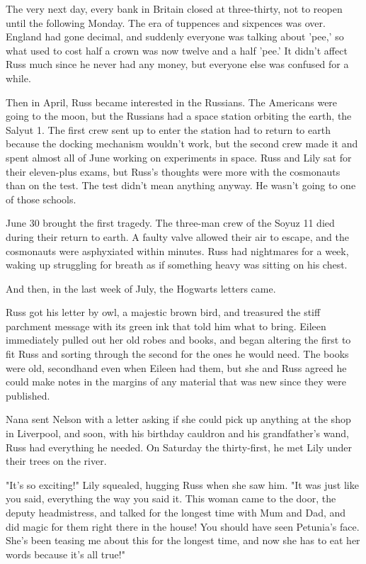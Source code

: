 \documentclass[a4paper,11pt]{article}
\begin{document}
The very next day, every bank in Britain closed at three-thirty, not to reopen until the following Monday. The era of tuppences and sixpences was over. England had gone decimal, and suddenly everyone was talking about 'pee,' so what used to cost half a crown was now twelve and a half 'pee.' It didn't affect Russ much since he never had any money, but everyone else was confused for a while.

Then in April, Russ became interested in the Russians. The Americans were going to the moon, but the Russians had a space station orbiting the earth, the Salyut 1. The first crew sent up to enter the station had to return to earth because the docking mechanism wouldn't work, but the second crew made it and spent almost all of June working on experiments in space. Russ and Lily sat for their eleven-plus exams, but Russ's thoughts were more with the cosmonauts than on the test. The test didn't mean anything anyway. He wasn't going to one of those schools.

June 30 brought the first tragedy. The three-man crew of the Soyuz 11 died during their return to earth. A faulty valve allowed their air to escape, and the cosmonauts were asphyxiated within minutes. Russ had nightmares for a week, waking up struggling for breath as if something heavy was sitting on his chest.

And then, in the last week of July, the Hogwarts letters came.

Russ got his letter by owl, a majestic brown bird, and treasured the stiff parchment message with its green ink that told him what to bring. Eileen immediately pulled out her old robes and books, and began altering the first to fit Russ and sorting through the second for the ones he would need. The books were old, secondhand even when Eileen had them, but she and Russ agreed he could make notes in the margins of any material that was new since they were published.

Nana sent Nelson with a letter asking if she could pick up anything at the shop in Liverpool, and soon, with his birthday cauldron and his grandfather's wand, Russ had everything he needed. On Saturday the thirty-first, he met Lily under their trees on the river.

"It's so exciting!" Lily squealed, hugging Russ when she saw him. "It was just like you said, everything the way you said it. This woman came to the door, the deputy headmistress, and talked for the longest time with Mum and Dad, and did magic for them right there in the house! You should have seen Petunia's face. She's been teasing me about this for the longest time, and now she has to eat her words because it's all true!"
\end{document}
